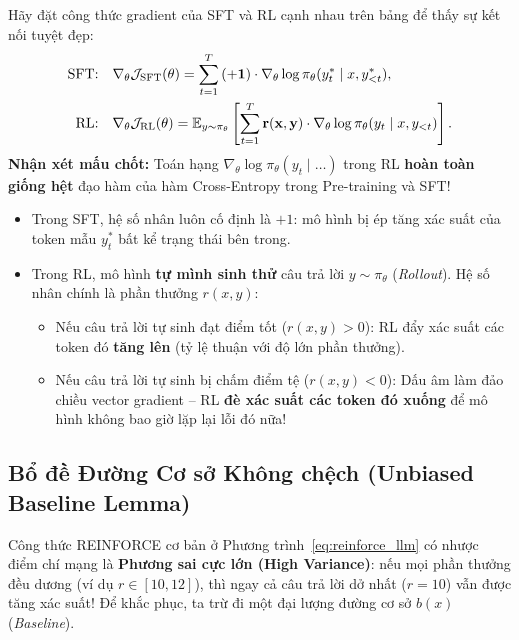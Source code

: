 \begin{pedagogy}
Hãy đặt công thức gradient của SFT và RL cạnh nhau trên bảng để thấy sự kết nối tuyệt đẹp:
\begin{align}
    \text{SFT:} \quad &\nabla_\theta \mathcal{J}_{\text{SFT}}(\theta) = \sum_{t=1}^{T} \mathbf{(+1)} \cdot \nabla_\theta \log \pi_\theta(y_t^* \mid x, y_{<t}^*), \label{eq:compare_sft} \\
    \text{RL:} \quad &\nabla_\theta \mathcal{J}_{\text{RL}}(\theta) = \operatorname{\mathbb{E}}_{y \sim \pi_\theta} \left[ \sum_{t=1}^{T} \mathbf{r(x, y)} \cdot \nabla_\theta \log \pi_\theta(y_t \mid x, y_{<t}) \right]. \label{eq:compare_rl}
\end{align}
\textbf{Nhận xét mấu chốt:} Toán hạng $\nabla_\theta \log \pi_\theta(y_t \mid \dots)$ trong RL \textbf{hoàn toàn giống hệt} đạo hàm của hàm Cross-Entropy trong Pre-training và SFT!
\begin{itemize}[leftmargin=1.2cm]
    \item Trong SFT, hệ số nhân luôn cố định là $+1$: mô hình bị ép tăng xác suất của token mẫu $y_t^*$ bất kể trạng thái bên trong.
    \item Trong RL, mô hình \textbf{tự mình sinh thử} câu trả lời $y \sim \pi_\theta$ (\textit{Rollout}). Hệ số nhân chính là phần thưởng $r(x, y)$:
    \begin{itemize}
        \item Nếu câu trả lời tự sinh đạt điểm tốt ($r(x, y) > 0$): RL đẩy xác suất các token đó \textbf{tăng lên} (tỷ lệ thuận với độ lớn phần thưởng).
        \item Nếu câu trả lời tự sinh bị chấm điểm tệ ($r(x, y) < 0$): Dấu âm làm đảo chiều vector gradient -- RL \textbf{đè xác suất các token đó xuống} để mô hình không bao giờ lặp lại lỗi đó nữa!
    \end{itemize}
\end{itemize}
\end{pedagogy}

\subsection{Bổ đề Đường Cơ sở Không chệch (Unbiased Baseline Lemma)}
Công thức REINFORCE cơ bản ở Phương trình~\eqref{eq:reinforce_llm} có nhược điểm chí mạng là \textbf{Phương sai cực lớn (High Variance)}: nếu mọi phần thưởng đều dương (ví dụ $r \in [10, 12]$), thì ngay cả câu trả lời dở nhất ($r = 10$) vẫn được tăng xác suất! Để khắc phục, ta trừ đi một đại lượng đường cơ sở $b(x)$ (\textit{Baseline}).

